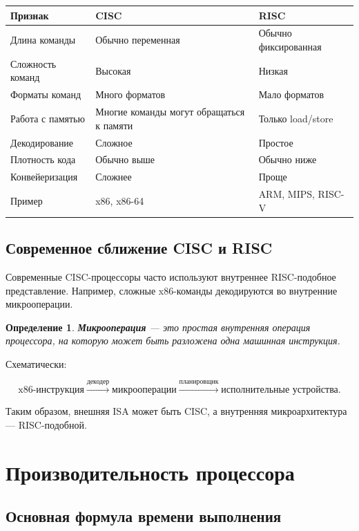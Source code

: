 \documentclass[12pt,a4paper]{article}
\newtheorem{definition}{Определение}
\begin{document}
\begin{longtable}{p{}p{}p{}}
\toprule
\textbf{Признак} & \textbf{CISC} & \textbf{RISC} \\
\midrule
Длина команды & Обычно переменная & Обычно фиксированная \\
\midrule
Сложность команд & Высокая & Низкая \\
\midrule
Форматы команд & Много форматов & Мало форматов \\
\midrule
Работа с памятью & Многие команды могут обращаться к памяти & Только load/store \\
\midrule
Декодирование & Сложное & Простое \\
\midrule
Плотность кода & Обычно выше & Обычно ниже \\
\midrule
Конвейеризация & Сложнее & Проще \\
\midrule
Пример & x86, x86-64 & ARM, MIPS, RISC-V \\
\bottomrule
\end{longtable}

\subsection{Современное сближение CISC и RISC}

Современные CISC-процессоры часто используют внутреннее RISC-подобное представление. Например, сложные x86-команды декодируются во внутренние микрооперации.

\begin{definition}
\textbf{Микрооперация} --- это простая внутренняя операция процессора, на которую может быть разложена одна машинная инструкция.
\end{definition}

Схематически:

\[
    \text{x86-инструкция}
    \xrightarrow{\text{декодер}}
    \text{микрооперации}
    \xrightarrow{\text{планировщик}}
    \text{исполнительные устройства}.
\]

Таким образом, внешняя ISA может быть CISC, а внутренняя микроархитектура --- RISC-подобной.

\section{Производительность процессора}

\subsection{Основная формула времени выполнения}
\end{document}
